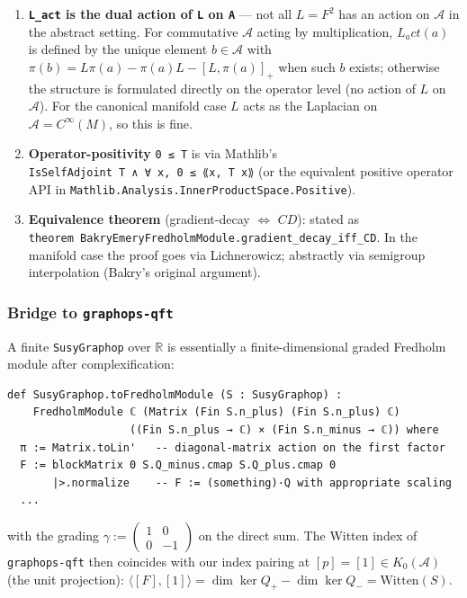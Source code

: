 \documentclass[
  11pt,
]{article}
\providecommand{\tightlist}{%
  \setlength{\itemsep}{0pt}\setlength{\parskip}{0pt}}
\begin{document}
\begin{enumerate}
\def\labelenumi{\arabic{enumi}.}
\tightlist
\item
  \textbf{\texttt{L\_act} is the dual action of \texttt{L} on
  \texttt{A}} --- not all \(L = F^2\) has an action on \(\mathcal{A}\)
  in the abstract setting. For commutative \(\mathcal{A}\) acting by
  multiplication, \(L_act(a)\) is defined by the unique element
  \(b \in \mathcal{A}\) with
  \(\pi(b) = L \pi(a) - \pi(a) L - [L, \pi(a)]_+\) when such \(b\)
  exists; otherwise the structure is formulated directly on the operator
  level (no action of \(L\) on \(\mathcal{A}\)). For the canonical
  manifold case \(L\) acts as the Laplacian on
  \(\mathcal{A}= C^\infty(M)\), so this is fine.
\item
  \textbf{Operator-positivity} \texttt{0\ ≤\ T} is via Mathlib's
  \texttt{IsSelfAdjoint\ T\ ∧\ ∀\ x,\ 0\ ≤\ ⟪x,\ T\ x⟫} (or the
  equivalent positive operator API in
  \texttt{Mathlib.Analysis.InnerProductSpace.Positive}).
\item
  \textbf{Equivalence theorem} (gradient-decay \(\Leftrightarrow\)
  \(CD\)): stated as
  \texttt{theorem\ BakryEmeryFredholmModule.gradient\_decay\_iff\_CD}.
  In the manifold case the proof goes via Lichnerowicz; abstractly via
  semigroup interpolation (Bakry's original argument).
\end{enumerate}

\subsubsection{\texorpdfstring{Bridge to
\texttt{graphops-qft}}{Bridge to graphops-qft}}\label{bridge-to-graphops-qft}

A finite \texttt{SusyGraphop} over \(\mathbb{R}\) is essentially a
finite-dimensional graded Fredholm module after complexification:

\begin{verbatim}
def SusyGraphop.toFredholmModule (S : SusyGraphop) :
    FredholmModule ℂ (Matrix (Fin S.n_plus) (Fin S.n_plus) ℂ)
                   ((Fin S.n_plus → ℂ) × (Fin S.n_minus → ℂ)) where
  π := Matrix.toLin'   -- diagonal-matrix action on the first factor
  F := blockMatrix 0 S.Q_minus.cmap S.Q_plus.cmap 0
       |>.normalize    -- F := (something)·Q with appropriate scaling
  ...
\end{verbatim}

with the grading
\(\gamma := \begin{pmatrix} 1 & 0 \\ 0 & -1 \end{pmatrix}\) on the
direct sum. The Witten index of \texttt{graphops-qft} then coincides
with our index pairing at \([p] = [1] \in K_0(\mathcal{A})\) (the unit
projection):
\(\langle [F], [1] \rangle = \dim \ker Q_+ - \dim \ker Q_- =
\mathrm{Witten}(S)\).
\end{document}
